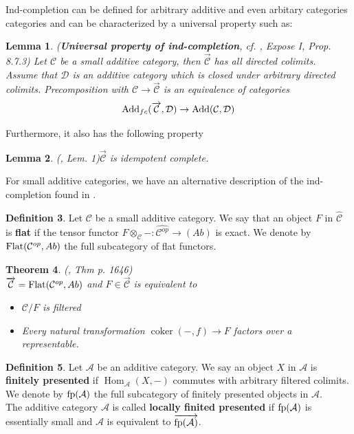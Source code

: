 \documentclass[11pt,a4paper]{amsart}
\theoremstyle{plain}
\newtheorem{thm}{Theorem}[section]
\newtheorem{lem}[thm]{Lemma}
\theoremstyle{definition}
\newtheorem{dfn}[thm]{Definition}
\DeclareMathOperator{\Hom}{Hom}
\DeclareMathOperator{\coKer}{coker}
\newcommand{\mcA}{\mathcal{A}}
\newcommand{\mcC}{\mathcal{C}}
\newcommand{\mcD}{\mathcal{D}}
\begin{document}
Ind-completion can be defined for arbitrary additive and even arbitary categories categories and can be characterized by a universal property such as:   
\begin{lem} (\textbf{Universal property of ind-completion}, cf. \cite{SGA4}, Expose I, Prop. 8.7.3) \label{UP-add}
Let $\mcC$ be a small additive category, then $\overrightarrow{\mcC}$ has all directed colimits. \\
Assume that $\mcD$ is an additive category which is closed under arbitrary directed colimits. Precomposition with $\mcC\to \overrightarrow{\mcC}$ is an equivalence of categories 
\[
{\rm Add}_{fc}(\overrightarrow{\mcC}, \mcD) \to {\rm Add}(\mcC, \mcD)
\]
\end{lem}
Furthermore, it also has the following property 
\begin{lem} (\cite{CB}, Lem. 1)\label{ic}
$\overrightarrow{\mcC}$ is idempotent complete. 
\end{lem}

For small additive categories, we have an alternative description of the ind-completion found in \cite{CB}.
\begin{dfn}
Let $\mcC$ be a small additive category. We say that an object $F$ in $\hat{\mcC}$ is \textbf{flat} if the tensor functor $F\otimes_{\mcC} -\colon \hat{\mcC^{op}}\to (Ab)$ is exact. 
We denote by $ {\rm Flat} (\mcC^{op},Ab)$ the full subcategory of flat functors. 
\end{dfn}

\begin{thm} (\cite{CB}, Thm p. 1646)\label{CBflat}\\
$\overrightarrow{\mcC}={\rm Flat} (\mcC^{op},Ab)$ and $F\in \overrightarrow{\mcC}$ is equivalent to 
\begin{itemize}
\item[(1)] $\mcC/F$ is filtered
\item[(2)] Every natural transformation $\coKer (-,f) \to F$ factors over a representable.  
\end{itemize}
\end{thm}


\begin{dfn}
Let $\mcA$ be an additive category. We say an object $X$ in $\mcA$ is \textbf{finitely presented} if $\Hom_{\mcA} (X,-)$ commutes with arbitrary filtered colimits. We denote by ${\rm fp} (\mcA)$ the full subcategory of finitely presented objects in $\mcA$. \\
The additive category $\mcA$ is called 
\textbf{locally finited presented} if ${\rm fp} (\mcA)$ is essentially small and $\mcA$ is equivalent to $\overrightarrow{{\rm fp}(\mcA)}$.  
\end{dfn}
\end{document}

